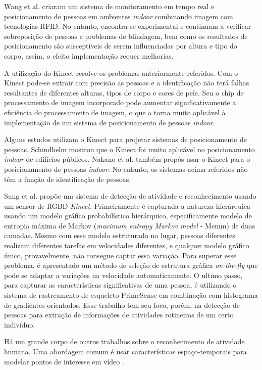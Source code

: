 Wang et al. \cite{wang2011flexible,wang2011rfid} criaram um sistema de monitoramento em tempo real e posicionamento de pessoas em ambientes \textit{indoor} combinando imagem com  tecnologias RFID. No entanto, encontra-se experimental e continuam a verificar sobreposição de pessoas e problemas de blindagem, bem como os resultados de posicionamento são susceptíveis de serem influenciadas por altura e tipo do corpo, assim, o efeito implementação requer melhorias.

A utilização do Kinect resolve os problemas anteriormente referidos. Com o Kinect pode-se extrair com precisão as pessoas e a identificação não terá falhas resultantes de diferentes alturas, tipos de corpo e cores de pele. Seu o chip de processamento de imagem incorporado pode aumentar significativamente a eficiência do processamento de imagem, o que a torna muito aplicável à implementação de um sistema de posicionamento de pessoas \textit{indoor}.

Alguns estudos utilizam o Kinect para projetar sistemas de posicionamento de pessoas. Schindhelm \cite{schindhelm2012evaluating} mostrou que o Kinect foi muito aplicável no posicionamento \textit{indoor} de edifícios públicos. Nakano et al. \cite{nakano2012kinect} também propôs usar o Kinect para o posicionamento de pessoas \textit{indoor}. No entanto, os sistemas acima referidos não têm a função de identificação de pessoas. 

Sung et al. \cite{sung2012unstructured} propõe um sistema de detecção de atividade e reconhecimento usando um sensor de RGBD \textit{Kinect}. Primeiramente é capturada a natureza hierárquica usando um modelo gráfico probabilístico hierárquico, especificamente modelo de entropia máxima de Markov (\textit{maximum entropy Markov model } - Memm) de duas camadas. Mesmo com esse modelo estruturado no lugar, pessoas diferentes realizam diferentes tarefas em velocidades diferentes, e qualquer modelo gráfico único, provavelmente, não consegue captar essa variação. Para superar esse problema, é apresentado um método de seleção de estrutura gráfica \textit{on-the-fly} que pode se adaptar a variações na velocidade automaticamente. O ultimo passo, para capturar as características significativas de uma pessoa, é utilizando o sistema de rastreamento de esqueleto PrimeSense \cite{primeSence2014} em combinação com histograma de gradientes orientados. Esse trabalho tem seu foco, porém, na detecção de pessoas para extração de informações de atividades rotineiras de um certo indivíduo.


Há um grande corpo de outros trabalhos sobre o reconhecimento de atividade humana. Uma abordagem comum é usar características espaço-temporais para modelar pontos de interesse em vídeo \cite{dollar2005behavior,laptev2003space}.



